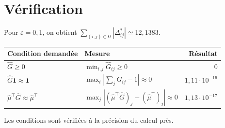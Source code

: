 \documentclass[11pt,a4paper]{article}
\newcommand{\toprule}{\hline}
\newcommand{\midrule}{\hline}
\newcommand{\bottomrule}{\hline}
\begin{document}
\section{Vérification}
Pour \(\varepsilon=0{,}1\), on obtient
\(\sum_{(i,j)\in\Omega}|\Delta^*_{ij}|\simeq12{,}1383\).
\begin{center}
\begin{minipage}{\linewidth}
\centering
\renewcommand{\arraystretch}{1.35}
\begin{tabular}{llr}
\toprule
Condition demandée & Mesure & Résultat\\
\midrule
\(\widehat G\geq0\) &
\(\min_{i,j}\widehat G_{ij}\geq0\) & \(0\)\\
\(\widehat G\mathbf 1\approx\mathbf 1\) &
\(\max_i|\sum_j\widehat G_{ij}-1|\approx0\) & \(1{,}11\cdot10^{-16}\)\\
\(\widehat\mu^\top\widehat G\approx\widehat\mu^\top\) &
\(\max_j|(\widehat\mu^\top\widehat G)_j-(\widehat\mu^\top)_j|\approx0\) &
\(1{,}13\cdot10^{-17}\)\\
\bottomrule
\end{tabular}
\makeatletter
\def\@captype{table}
\makeatother
\caption{Vérification de la matrice modifiée.}
\label{tab:verification}
\end{minipage}
\end{center}
Les conditions sont vérifiées à la précision du calcul près.
\end{document}
